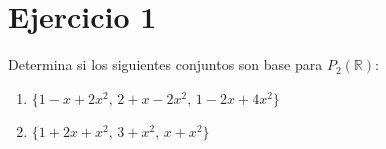 \section*{Ejercicio 1}

Determina si los siguientes conjuntos son base para $P_2(\mathbb{R})$:

\begin{enumerate}
    \item $\{ 1 - x + 2x^{2},\, 2 + x - 2x^{2},\, 1 - 2x + 4x^{2} \}$
    \item $\{ 1 + 2x + x^{2},\, 3 + x^{2},\, x + x^{2}\}$
\end{enumerate}